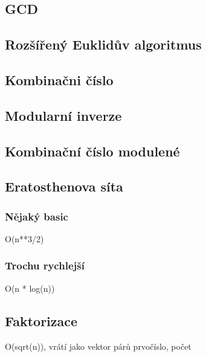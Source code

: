 \documentclass[10pt, a4paper]{article}
\begin{document}
\subsection{GCD}


\subsection{Rozšířený Euklidův algoritmus}


\subsection{Kombinačni číslo}


\subsection{Modularní inverze}


\subsection{Kombinační číslo modulené}


\subsection{Eratosthenova síta}
\subsubsection{Nějaký basic}
O(n**3/2)


\subsubsection{Trochu rychlejší}
O(n * log(n))


\subsection{Faktorizace}
O(sqrt(n)), vrátí jako vektor párů {prvočíslo, počet}

\end{document}
